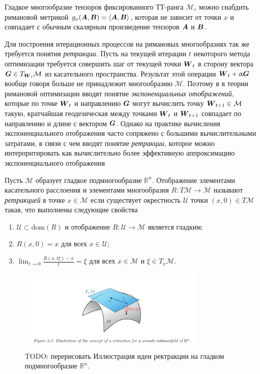 Гладкое многообразие тензоров фиксированного ТТ-ранга $\mathcal{M}_r$ можно снабдить римановой метрикой $g_x(\boldsymbol{A}, \boldsymbol{B}) = \langle \boldsymbol{A}, \boldsymbol{B} \rangle$, которая не зависит от точки $x$ и совпадает с обычным скалярным произведение тензоров $\boldsymbol{A}$ и $\boldsymbol{B}$.

Для построения итерационных процессов на римановых многообразиях так же требуется понятия \emph{ретракции}. Пусть на текущей итерации $t$ некоторого метода оптимизации требуется совершить шаг от текущей точки $\boldsymbol{W}_t$ в сторону вектора $\boldsymbol{G} \in T_{\boldsymbol{W}_t} \mathcal{M}$ из касательного пространства. Результат этой операции $\boldsymbol{W}_t + \upalpha \boldsymbol{G}$ вообще говоря больше не принадлежит многообразию $\mathcal{M}$. Поэтому в в теории римановой оптимизации вводят понятие \emph{экспоненциальных отображений}, которые по точке $\boldsymbol{W}_t$ и направлению $\boldsymbol{G}$ могут вычислить точку $\boldsymbol{W}_{t+1} \in \mathcal{M}$ такую, кратчайшая геодезическая между точками $\boldsymbol{W}_t$ и $\boldsymbol{W}_{t+1}$ совпадает по направлению и длине с вектором $\boldsymbol{G}$. Однако на практике вычисления экспоненциального отображения часто сопряжено с большими вычислительными затратами, в связи с чем вводят понятие \emph{ретракции}, которое можно интерпритировать как вычислительно более эффективную аппроксимацию экспоненциального отображения
\begin{definition}
	\cite{AM12, Def. 1} Пусть $\mathcal{M}$ образует гладкое подмногообразие $\mathbb{R}^n$. Отображение элементами касательного расслоения и элементами многообразия $R : T\mathcal{M} \to \mathcal{M}$ называют \emph{ретракцией} в точке $x \in \mathcal{M}$ если существует окрестность $\mathcal{U}$ точки $(x, 0) \in T \mathcal{M}$ такая, что выполнены следующие свойства
	\begin{enumerate}
		\item $\mathcal{U} \subset \text{dom}(R)$ и отображение $R : \mathcal{U} \to \mathcal{M}$ является гладким;
		\item $R(x, 0) = x$ для всех $x \in \mathcal{U}$;
		\item $\lim_{t \to 0} \frac{R(x, t \xi) - x}{t} = \xi$ для всех $x \in \mathcal{M}$ и $\xi \in T_x \mathcal{M}$.
	\end{enumerate}
\end{definition}

\begin{figure}[t]
\begin{center}
  \includegraphics[width=0.8\textwidth]{images/retraction.png}
  \caption{\alert{TODO: перерисовать} Иллюстрация идеи ректракции на гладком подмногообразие $\mathbb{R}^n$. \label{fig:retraction}}
  \end{center}
\end{figure}

